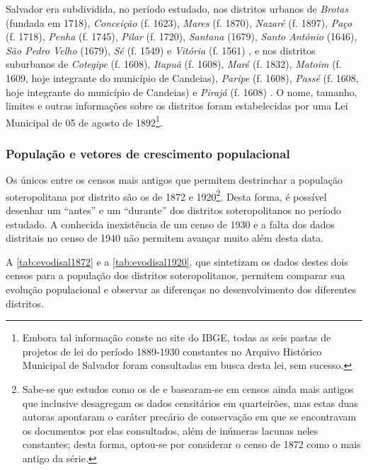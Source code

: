Salvador era subdividida, no período estudado, nos distritos urbanos de \textit{Brotas} (fundada em 1718), \textit{Conceição} (f. 1623), \textit{Mares} (f. 1870), \textit{Nazaré} (f. 1897), \textit{Paço} (f. 1718), \textit{Penha} (f. 1745), \textit{Pilar} (f. 1720), \textit{Santana} (1679), \textit{Santo Antônio }(1646), \textit{São Pedro Velho} (1679), \textit{Sé} (f. 1549) e \textit{Vitória} (f. 1561) \cite[259-307]{VASCONCELOS2002}, e nos distritos suburbanos de \textit{Cotegipe} (f. 1608), \textit{Itapuã} (f. 1608), \textit{Maré} (f. 1832), \textit{Matoim} (f. 1609, hoje integrante do município de Candeias), \textit{Paripe} (f. 1608), \textit{Passé} (f. 1608, hoje integrante do município de Candeias) e \textit{Pirajá} (f. 1608) \cite[p.~53-62]{NASCIMENTO2007}. O nome, tamanho, limites e outras informações sobre os distritos foram estabelecidas por uma Lei Municipal de 05 de agosto de 1892\footnote{Embora tal informação conste no site do IBGE, todas as seis pastas de projetos de lei do período 1889-1930 constantes no Arquivo Histórico Municipal de Salvador foram consultadas em busca desta lei, sem sucesso.}.

\subsubsection{População e vetores de crescimento populacional}\label{subsubsec:populacaosalvador}

Os únicos entre os censos mais antigos que permitem destrinchar a população soteropolitana por distrito são os de 1872 e 1920\footnote{Sabe-se que estudos como os de  e  basearam-se em censos ainda mais antigos que inclusive desagregam os dados censitários em quarteirões, mas estas duas autoras apontaram o caráter precário de conservação em que se encontravam os documentos por elas consultados, além de inúmeras lacunas neles constantes; desta forma, optou-se por considerar o censo de 1872 como o mais antigo da série.}. Desta forma, é possível desenhar um ``antes'' e um ``durante'' dos distritos soteropolitanos no período estudado. A conhecida inexistência de um censo de 1930 e a falta dos dados distritais no censo de 1940 não permitem avançar muito além desta data. 

A \autoref{tab:evodisal1872} e a \autoref{tab:evodisal1920}, que sintetizam os dados destes dois censos para a população dos distritos soteropolitanos, permitem comparar sua evolução populacional e observar as diferenças no desenvolvimento dos diferentes distritos. 

